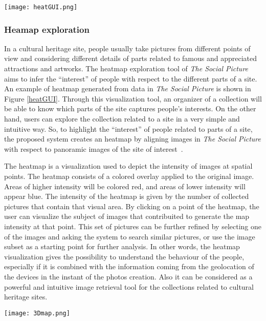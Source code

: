 \begin{figure*}
	\centering
	\texttt{[image: heatGUI.png]}
	\caption{heatmap exploration tool. By selecting a point in the heatmap, the system visualizes all the photos that contributed to that point in the bottom part of the interface.}
	\label{heatGUI}
\end{figure*}

\subsubsection{Heamap exploration}
In a cultural heritage site, people usually take pictures from different points of view and considering different details of parts related to famous and appreciated attractions and artworks. The heatmap exploration tool of \textit{The Social Picture} aims to infer the ``interest'' of people with respect to the different parts of a site. An example of heatmap generated from data in \textit{The Social Picture} is shown in Figure \ref{heatGUI}. Through this visualization tool, an organizer of a collection will be able to know which parts of the site captures people's interests.
On the other hand, users can explore the collection related to a site in a very simple and intuitive way. So, to highlight the ``interest'' of people related to parts of a site, the proposed system creates an heatmap by aligning images in \textit{The Social Picture} with respect to panoramic images of the site of interest~\cite{Mikulik2015}.

The heatmap is a visualization used to depict the intensity of images at spatial points. The heatmap consists of a colored overlay applied to the original image. Areas of higher intensity will be colored red, and areas of lower intensity will appear blue. The intensity of the heatmap is given by the number of collected pictures that contain that visual area.
By clicking on a point of the heatmap, the user can visualize the subject of images that contribuited to generate the map intensity at that point. This set of pictures can be further refined by selecting one of the images and asking the system to search similar pictures, or use the image subset as a starting point for further analysis. In other words, the heatmap visualization gives the possibility to understand the behaviour of the people, especially if it is combined with the information coming from the geolocation of the devices in the instant of the photos creation. Also it can be considered as a powerful and intuitive image retrieval tool for the collections related to cultural heritage sites.
\begin{figure*}
	\centering
	\texttt{[image: 3Dmap.png]}
	\caption{3D sparse reconstruction of a cultural heritage site based on the photos of the collecction. Each point in the 3D space is estimated by considering the projections of the images depicting that part of the scene.}
	\label{3Dmap}
\end{figure*}

